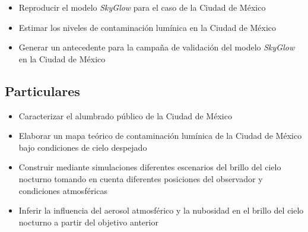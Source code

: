 \begin{itemize}

    \item Reproducir el modelo \textit{SkyGlow} para el caso de la Ciudad de México
    
    \item Estimar los niveles de contaminación lumínica en la Ciudad de México 
    
    \item Generar un antecedente para la campaña de validación del modelo \textit{SkyGlow} en la Ciudad de México
    
\end{itemize}

\subsection{Particulares}

\begin{itemize}

    \item Caracterizar el alumbrado público de la Ciudad de México 
    
    \item Elaborar un mapa teórico de contaminación lumínica de la Ciudad de México bajo condiciones de cielo despejado
    
    \item Construir mediante simulaciones diferentes escenarios del brillo del cielo nocturno tomando en cuenta diferentes posiciones del observador y condiciones atmosféricas
    
    \item Inferir la influencia del aerosol atmosférico  y la nubosidad en el brillo del cielo nocturno a partir del objetivo anterior
    
    
\end{itemize}